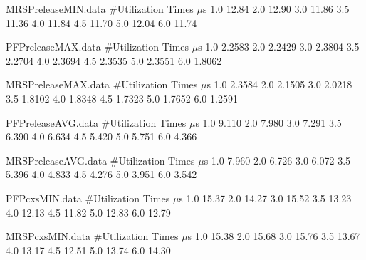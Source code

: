\begin{filecontents}{MRSPreleaseMIN.data}
#Utilization   Times $\mu$s
1.0  12.84
2.0  12.90
3.0  11.86
3.5  11.36
4.0  11.84
4.5  11.70
5.0  12.04
6.0  11.74
\end{filecontents}


\begin{filecontents}{PFPreleaseMAX.data}
#Utilization   Times $\mu$s
1.0  2.2583
2.0  2.2429
3.0  2.3804
3.5  2.2704
4.0  2.3694
4.5  2.3535
5.0  2.3551
6.0  1.8062
\end{filecontents}

\begin{filecontents}{MRSPreleaseMAX.data}
#Utilization   Times $\mu$s
1.0  2.3584
2.0  2.1505
3.0  2.0218
3.5  1.8102
4.0  1.8348
4.5  1.7323
5.0  1.7652
6.0  1.2591
\end{filecontents}

\begin{filecontents}{PFPreleaseAVG.data}
#Utilization   Times $\mu$s
1.0  9.110
2.0  7.980
3.0  7.291
3.5  6.390
4.0  6.634
4.5  5.420
5.0  5.751
6.0  4.366
\end{filecontents}

\begin{filecontents}{MRSPreleaseAVG.data}
#Utilization   Times $\mu$s
1.0  7.960
2.0  6.726
3.0  6.072
3.5  5.396
4.0  4.833
4.5  4.276
5.0  3.951
6.0  3.542
\end{filecontents}


\begin{filecontents}{PFPcxsMIN.data}
#Utilization   Times $\mu$s
1.0  15.37
2.0  14.27
3.0  15.52
3.5  13.23
4.0  12.13
4.5  11.82
5.0  12.83
6.0  12.79
\end{filecontents}

\begin{filecontents}{MRSPcxsMIN.data}
#Utilization   Times $\mu$s
1.0  15.38
2.0  15.68
3.0  15.76
3.5  13.67
4.0  13.17
4.5  12.51
5.0  13.74
6.0  14.30
\end{filecontents}


